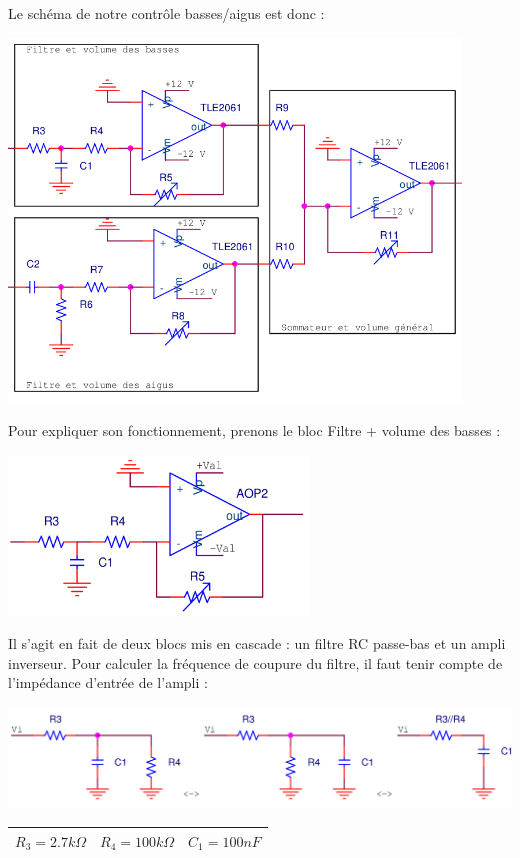 \documentclass{../template/labo}
\begin{document}
Le schéma de notre contrôle basses/aigus est donc :
\begin{center}
\includegraphics[width=12cm]{figures/egaliseur_sommateur.png}
\end{center}

Pour expliquer son fonctionnement, prenons le bloc Filtre + volume des basses :
\begin{center}
\includegraphics[width=8cm]{figures/AOPfiltrebasse}
\end{center}
Il s'agit en fait de deux blocs mis en cascade : un filtre RC passe-bas et un ampli inverseur.
Pour calculer la fréquence de coupure du filtre, il faut tenir compte de l'impédance d'entrée de l'ampli :
\begin{center}
\includegraphics[width=14cm]{figures/filter.png}

\begin{tabular}{|c||c||c|}\hline
$R_3 = 2.7 k\Omega$ & $R_4 = 100 k\Omega$ & $C_1 = 100 nF$ \\ \hline
\end{tabular}
\end{center}
\end{document}
